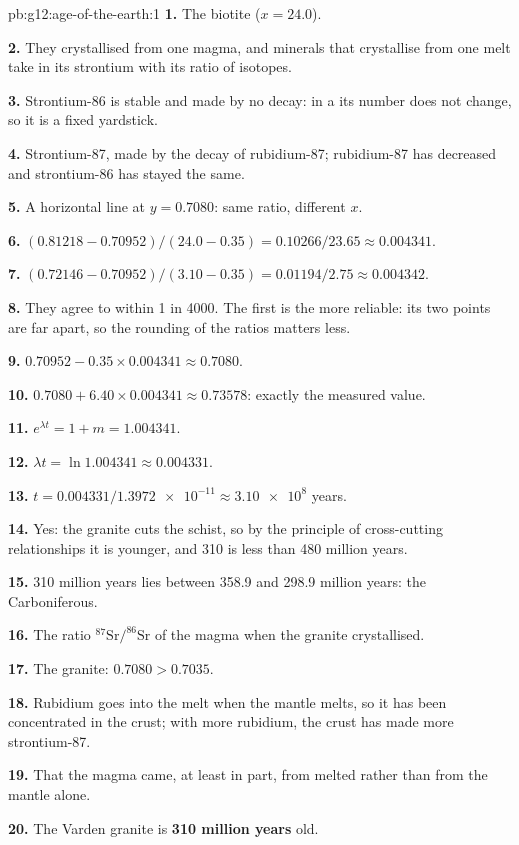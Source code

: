 \begin{solution}{pb:g12:age-of-the-earth:1}
\textbf{1.} The biotite ($x = 24.0$).

\textbf{2.} They crystallised from one magma, and minerals that crystallise
from one melt take in its strontium with its ratio of isotopes.

\textbf{3.} Strontium-86 is stable and made by no decay: in a 
its number does not change, so it is a fixed yardstick.

\textbf{4.} Strontium-87, made by the decay of rubidium-87; rubidium-87 has
decreased and strontium-86 has stayed the same.

\textbf{5.} A horizontal line at $y = 0.7080$: same ratio, different $x$.

\textbf{6.} $(0.81218 - 0.70952)/(24.0 - 0.35) = 0.10266/23.65 \approx
0.004341$.

\textbf{7.} $(0.72146 - 0.70952)/(3.10 - 0.35) = 0.01194/2.75 \approx
0.004342$.

\textbf{8.} They agree to within 1 in 4000. The first is the more reliable:
its two points are far apart, so the rounding of the ratios matters less.

\textbf{9.} $0.70952 - 0.35 \times 0.004341 \approx 0.7080$.

\textbf{10.} $0.7080 + 6.40 \times 0.004341 \approx 0.73578$: exactly the
measured value.

\textbf{11.} $e^{\lambda t} = 1 + m = 1.004341$.

\textbf{12.} $\lambda t = \ln 1.004341 \approx 0.004331$.

\textbf{13.} $t = 0.004331/\num{1.3972e-11} \approx \num{3.10e8}$ years.

\textbf{14.} Yes: the granite cuts the schist, so by the principle of
cross-cutting relationships it is younger, and 310 is less than 480 million
years.

\textbf{15.} 310 million years lies between 358.9 and 298.9 million years:
the Carboniferous.

\textbf{16.} The ratio $^{87}\mathrm{Sr}/^{86}\mathrm{Sr}$ of the magma when
the granite crystallised.

\textbf{17.} The granite: $0.7080 > 0.7035$.

\textbf{18.} Rubidium goes into the melt when the mantle melts, so it has
been concentrated in the crust; with more rubidium, the crust has made more
strontium-87.

\textbf{19.} That the magma came, at least in part, from melted  rather than from the mantle alone.

\textbf{20.} The Varden granite is \textbf{310 million years} old.
\end{solution}
